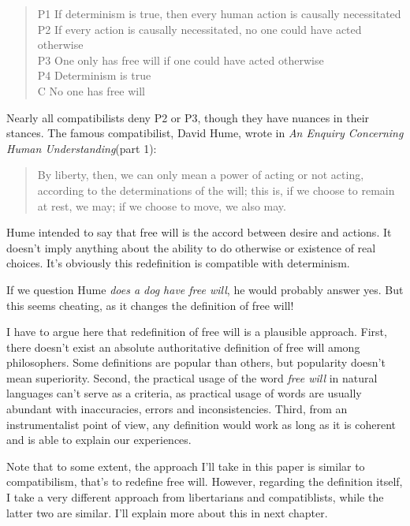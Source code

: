 \begin{quote}
P1 If determinism is true, then every human action is causally necessitated \\
P2 If every action is causally necessitated, no one could have acted otherwise \\
P3 One only has free will if one could have acted otherwise \\
P4 Determinism is true \\
C No one has free will
\end{quote}

Nearly all compatibilists deny P2 or P3, though they have nuances in their stances. The famous compatibilist, David Hume, wrote in \emph{An Enquiry Concerning Human Understanding}(part 1):

\begin{quote}
By liberty, then, we can only mean a power of acting or not acting, according to the determinations of the will; this is, if we choose to remain at rest, we may; if we choose to move, we also may.
\end{quote}

Hume intended to say that free will is the accord between desire and actions. It doesn't imply anything about the ability to do otherwise or existence of real choices. It's obviously this redefinition is compatible with determinism.

If we question Hume \emph{does a dog have free will}, he would probably answer yes. But this seems cheating, as it changes the definition of free will!

I have to argue here that redefinition of free will is a plausible approach. First, there doesn't exist an absolute authoritative definition of free will among philosophers. Some definitions are popular than others, but popularity doesn't mean superiority. Second, the practical usage of the word \emph{free will} in natural languages can't serve as a criteria, as practical usage of words are usually abundant with inaccuracies,  errors and inconsistencies. Third, from an instrumentalist point of view, any definition would work as long as it is coherent and is able to explain our experiences.

Note that to some extent, the approach I'll take in this paper is similar to compatibilism, that's to redefine free will. However, regarding the definition itself, I take a very different approach from libertarians and compatiblists, while the latter two are similar. I'll explain more about this in next chapter.

